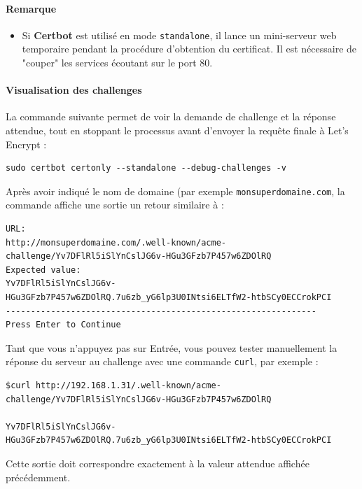 \documentclass[french, 12pt]{article}%
\newcommand{\itemE}{\item[$\bullet$]}
\begin{document}
\paragraph{Remarque}
\begin{itemize}
  \itemE Si \textbf{Certbot} est utilisé en mode \texttt{standalone}, il lance un mini-serveur web temporaire pendant la procédure d’obtention du certificat.  
Il est nécessaire de "couper" les services écoutant sur le port 80.
\end{itemize}

\paragraph{Visualisation des challenges}

La commande suivante permet de voir la demande de challenge et la réponse attendue, tout en stoppant le processus avant d’envoyer la requête finale à Let's Encrypt :

\begin{lstlisting}[style=commande]
sudo certbot certonly --standalone --debug-challenges -v
\end{lstlisting}

Après avoir indiqué le nom de domaine (par exemple \verb?monsuperdomaine.com?, la commande affiche une sortie un retour similaire à : 

\begin{lstlisting}[style=commande]
URL:
http://monsuperdomaine.com/.well-known/acme-challenge/Yv7DFlRl5iSlYnCslJG6v-HGu3GFzb7P457w6ZDOlRQ
Expected value:
Yv7DFlRl5iSlYnCslJG6v-HGu3GFzb7P457w6ZDOlRQ.7u6zb_yG6lp3U0INtsi6ELTfW2-htbSCy0ECCrokPCI
--------------------------------------------------------------
Press Enter to Continue
\end{lstlisting}

Tant que vous n’appuyez pas sur Entrée, vous pouvez tester manuellement la réponse du serveur au challenge avec une commande \texttt{curl}, par exemple :

\begin{lstlisting}[style=commande]
$curl http://192.168.1.31/.well-known/acme-challenge/Yv7DFlRl5iSlYnCslJG6v-HGu3GFzb7P457w6ZDOlRQ

Yv7DFlRl5iSlYnCslJG6v-HGu3GFzb7P457w6ZDOlRQ.7u6zb_yG6lp3U0INtsi6ELTfW2-htbSCy0ECCrokPCI
\end{lstlisting}

Cette sortie doit correspondre exactement à la valeur attendue affichée précédemment.
\end{document}

